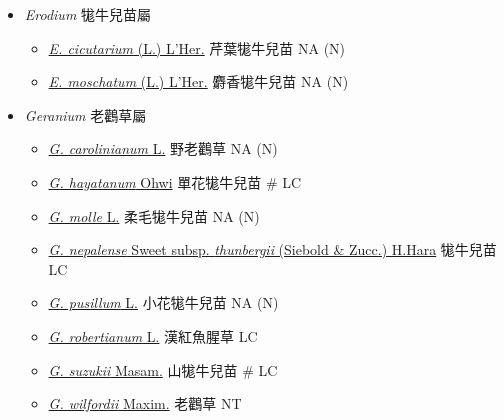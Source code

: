 
  \begin{itemize}
 \item[] \textit{Erodium} 牻牛兒苗屬
                                
  \begin{itemize}
        \item[] \href{http://www.theplantlist.org/tpl1.1/search?q=Erodium+cicutarium}{\textit{E. cicutarium} (L.) L'Her.}   芹葉牻牛兒苗   NA (N)
        \item[] \href{http://www.theplantlist.org/tpl1.1/search?q=Erodium+moschatum}{\textit{E. moschatum} (L.) L'Her.}   麝香牻牛兒苗   NA (N)
  \end{itemize}
 \item[] \textit{Geranium} 老鸛草屬
                                
  \begin{itemize}
        \item[] \href{http://www.theplantlist.org/tpl1.1/search?q=Geranium+carolinianum}{\textit{G. carolinianum} L.}   野老鸛草   NA (N)
        \item[] \href{http://www.theplantlist.org/tpl1.1/search?q=Geranium+hayatanum}{\textit{G. hayatanum} Ohwi}   單花牻牛兒苗  \# LC
        \item[] \href{http://www.theplantlist.org/tpl1.1/search?q=Geranium+molle}{\textit{G. molle} L.}   柔毛牻牛兒苗   NA (N)
        \item[] \href{http://www.theplantlist.org/tpl1.1/search?q=Geranium+nepalense+subsp.+thunbergii}{\textit{G. nepalense} Sweet subsp. \textit{thunbergii} (Siebold \& Zucc.) H.Hara}   牻牛兒苗   LC
        \item[] \href{http://www.theplantlist.org/tpl1.1/search?q=Geranium+pusillum}{\textit{G. pusillum} L.}   小花牻牛兒苗   NA (N)
        \item[] \href{http://www.theplantlist.org/tpl1.1/search?q=Geranium+robertianum}{\textit{G. robertianum} L.}   漢紅魚腥草   LC
        \item[] \href{http://www.theplantlist.org/tpl1.1/search?q=Geranium+suzukii}{\textit{G. suzukii} Masam.}   山牻牛兒苗  \# LC
        \item[] \href{http://www.theplantlist.org/tpl1.1/search?q=Geranium+wilfordii}{\textit{G. wilfordii} Maxim.}   老鸛草   NT
  \end{itemize}
  \end{itemize}
